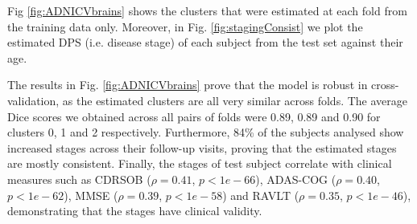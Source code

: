 Fig \ref{fig:ADNICVbrains} shows the clusters that were estimated at each fold from the training data only. Moreover, in Fig. \ref{fig:stagingConsist} we plot the estimated DPS (i.e. disease stage) of each subject from the test set against their age.

The results in Fig. \ref{fig:ADNICVbrains} prove that the model is robust in cross-validation, as the estimated clusters are all very similar across folds. The average Dice scores we obtained across all pairs of folds were 0.89, 0.89 and 0.90 for clusters 0, 1 and 2 respectively. Furthermore, 84\% of the subjects analysed show increased stages across their follow-up visits, proving that the estimated stages are mostly consistent. Finally, the stages of test subject correlate with clinical measures such as CDRSOB ($\rho = 0.41$, $p < 1e-66$), ADAS-COG ($\rho = 0.40$, $p < 1e-62$), MMSE ($\rho = 0.39$, $p < 1e-58$) and RAVLT ($\rho = 0.35$, $p < 1e-46$), demonstrating that the stages have clinical validity.

\newcommand{\outFoldADNICVbrains}{images/vwdpm/crossvalid/adniThavgFWHM0Initk-meansCl3Pr0Ra1_VWDPMMean}

